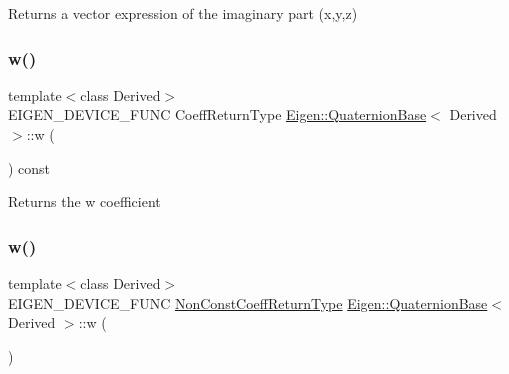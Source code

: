 \begin{DoxyReturn}{Returns}
a vector expression of the imaginary part (x,y,z) 
\end{DoxyReturn}
\mbox{\label{class_eigen_1_1_quaternion_base_a6221021558ba509e7a5a7fc68092034d}} 
\subsubsection{\texorpdfstring{w()}{w()}\hspace{0.1cm}{\footnotesize\ttfamily [1/2]}}
{\footnotesize\ttfamily template$<$class Derived$>$ \\
E\+I\+G\+E\+N\+\_\+\+D\+E\+V\+I\+C\+E\+\_\+\+F\+U\+NC Coeff\+Return\+Type \mbox{\hyperlink{class_eigen_1_1_quaternion_base}{Eigen\+::\+Quaternion\+Base}}$<$ Derived $>$\+::w (\begin{DoxyParamCaption}{ }\end{DoxyParamCaption}) const\hspace{0.3cm}{\ttfamily [inline]}}

\begin{DoxyReturn}{Returns}
the {\ttfamily w} coefficient 
\end{DoxyReturn}
\mbox{\label{class_eigen_1_1_quaternion_base_ab24b4111eef9a4085b1cfe33291f45a9}} 
\subsubsection{\texorpdfstring{w()}{w()}\hspace{0.1cm}{\footnotesize\ttfamily [2/2]}}
{\footnotesize\ttfamily template$<$class Derived$>$ \\
E\+I\+G\+E\+N\+\_\+\+D\+E\+V\+I\+C\+E\+\_\+\+F\+U\+NC \mbox{\hyperlink{struct_eigen_1_1internal_1_1true__type}{Non\+Const\+Coeff\+Return\+Type}} \mbox{\hyperlink{class_eigen_1_1_quaternion_base}{Eigen\+::\+Quaternion\+Base}}$<$ Derived $>$\+::w (\begin{DoxyParamCaption}{ }\end{DoxyParamCaption})\hspace{0.3cm}{\ttfamily [inline]}}

